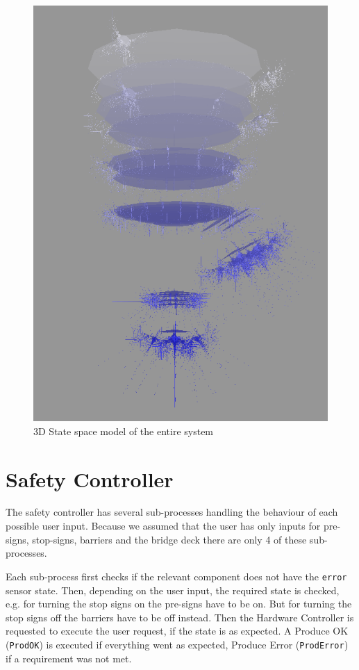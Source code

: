 	\begin{figure}[h]
		\centering
		\includegraphics[height=0.4\textheight]{images/state_model.png}
		\caption{3D State space model of the entire system}
		\label{fig:statespace}
	\end{figure}

	\section{Safety Controller}
		The safety controller has several sub-processes handling the behaviour of each possible user input.		
		Because we assumed that the user has only inputs for pre-signs,
		stop-signs, barriers and the bridge deck there are only 4 of these sub-processes.
 
		Each sub-process first checks if the relevant component does not have the \texttt{error} sensor state.
		Then, depending on the user input, the required state is checked,
		e.g. for turning the stop signs on the pre-signs have to be on.
		But for turning the stop signs off the barriers have to be off instead.
		Then the Hardware Controller is requested to execute the user request,
 if the state is as expected.
 	 A Produce OK (\texttt{ProdOK}) is executed if everything went as expected,
 	 Produce Error (\texttt{ProdError}) if a requirement was not met.

